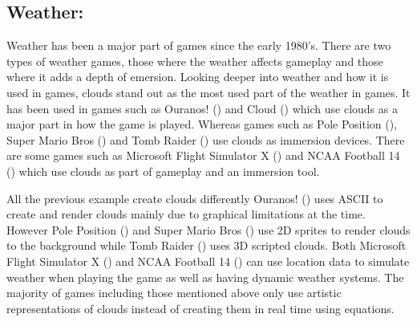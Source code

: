 \subsection{Weather:}
Weather has been a major part of games since the early 1980’s.
There are two types of weather games, those where the weather affects gameplay and those where it adds a depth of emersion.
Looking deeper into weather and how it is used in games, clouds stand out as the most used part of the weather in games.
It has been used in games such as Ouranos! (\citeyear{Ouranos80}) and Cloud (\citeyear{Cloud05}) which use clouds as a major part in how the game is played.
Whereas games such as Pole Position (\citeyear{PolePosition82}), Super Mario Bros (\citeyear{SMB85}) and Tomb Raider (\citeyear{TombRaider13}) use clouds as immersion devices.
There are some games such as Microsoft Flight Simulator X (\citeyear{MFS03}) and NCAA Football 14 (\citeyear{NCAAF13}) which use clouds as part of gameplay and an immersion tool. 

All the previous example create clouds differently Ouranos! (\citeyear{Ouranos80}) uses ASCII to create and render clouds mainly due to graphical limitations at the time.
However Pole Position (\citeyear{PolePosition82}) and Super Mario Bros (\citeyear{SMB85}) use 2D sprites to render clouds to the background while Tomb Raider (\citeyear{TombRaider13}) uses 3D scripted clouds.
Both Microsoft Flight Simulator X (\citeyear{MFS03}) and NCAA Football 14 (\citeyear{NCAAF13}) can use location data to simulate weather when playing the game as well as having dynamic weather systems.
The majority of games including those mentioned above only use artistic representations of clouds instead of creating them in real time using equations.